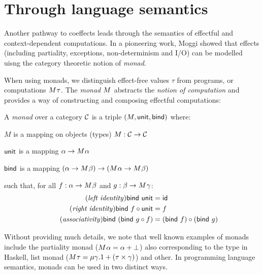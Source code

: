 
\section{Through language semantics}
\label{sec:path-sem}

Another pathway to coeffects leads through the semantics of effectful and context-dependent 
computations. In a pioneering work, Moggi \cite{monad-notions} showed that effects (including
partiality, exceptions, non-determinism and I/O) can be modelled uisng the category theoretic
notion of \emph{monad}.

When using monads, we distinguish effect-free values $\tau$ from programs, or 
computations $M^{}\tau$. The \emph{monad} $M^{}$ abstracts the \emph{notion of 
computation} and provides a way of constructing and composing effectful computations:

\begin{definition}
A \emph{monad} over a category $\mathcal{C}$ is a triple $(M, \textnormal{\sffamily unit}, \textnormal{\sffamily bind})$ where:
\begin{compactitem}
\item $M$ is a mapping on objects (types) $M : \mathcal{C} \rightarrow \mathcal{C}$
\item $\textnormal{\sffamily unit}$ is a mapping $\alpha \rightarrow M^{}\alpha$ 
\item $\textnormal{\sffamily bind}$ is a mapping $(\alpha \rightarrow M^{}\beta) 
  \rightarrow (M^{}\alpha \rightarrow M^{}\beta)$
\end{compactitem}
such that, for all $f:\alpha \rightarrow M^{}\beta$ and $g:\beta \rightarrow M^{}\gamma$:
\begin{align}
\tag{\emph{left identity}}
  \ident{bind}~\ident{unit} &= \idf{}
  \\
\tag{\emph{right identity}}
  \ident{bind}~f \circ \ident{unit} &= f
  \\
\tag{\emph{associativity}}
  \ident{bind}~(\ident{bind}~g \circ f) &= (\ident{bind}~f) \circ (\ident{bind}~g)
\end{align}
\end{definition}

\noindent
Without providing much details, we note that well known examples of monads include the partiality
monad ($M^{}\alpha = \alpha + {\bot}$) also corresponding to the  type in 
Haskell, list monad ($M^{}\tau = \mu \gamma.1 + (\tau \times \gamma)$) and other.
In programming language semantics, monads can be used in two distinct ways.

